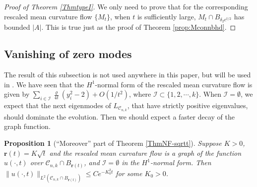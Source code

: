 \documentclass[11pt]{amsart}
\numberwithin{equation}{section}
\newtheorem{proposition}[theorem]{Proposition}
\numberwithin{equation}{section}
\newcommand{\br}{\mathbf{r}}
\newcommand{\cC}{\mathcal{C}}
\newcommand{\cI}{\mathcal{I}}
\begin{document}
	
	\begin{proof}[Proof of Theorem \ref{ThmtypeI}]
		We only need to prove that for the corresponding rescaled mean curvature flow $\{M_t\}$, when $t$ is sufficiently large, $M_t\cap B_{\delta_2e^{t/2}}$ has bounded $|A|$. This is true just as the proof of Theorem \ref{prop:Mconnbhd}.
	\end{proof}
	
	
	\subsection{Vanishing of zero modes}
	The result of this subsection is not used anywhere in this paper, but will be used in \cite{SunWangXue2_RegSing}. We have seen that the $H^1$-normal form of the rescaled mean curvature flow is given by $\sum_{i\in\cI}\frac{\varrho}{4t}(y_i^2-2)+O(1/t^2)$, where $\cI\subset\{1,2,\cdots,k\}$. When $\cI=\emptyset$, we expect that the next eigenmodes of $L_{\cC_{n,k}}$, that have strictly positive eigenvalues, should dominate the evolution. Then we should expect a faster decay of the graph function.
	
	\begin{proposition}[``Moreover'' part of Theorem \ref{ThmNF-sqrtt}]\label{prop:decay order zero normal form}
		Suppose $K>0$, $\br(t)=K\sqrt{t}$ and the rescaled mean curvature flow is a graph of the function $u(\cdot,t)$ over $\cC_{n,k}\cap B_{\br(t)}$, and $\cI=\emptyset$ in the $H^1$-normal form. Then  $\|u(\cdot,t)\|_{L^2(\cC_{n,k}\cap B_{\br(t)})}\leq Ce^{-K_0^2 t}$ for some $K_0>0$. 
	\end{proposition}
	
\end{document}
